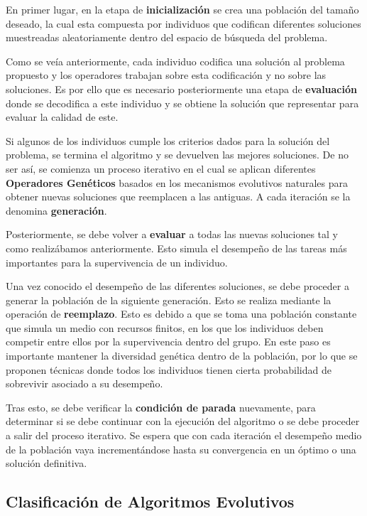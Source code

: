 En primer lugar, en la etapa de \textbf{inicialización} se crea una población del tamaño deseado, la cual esta compuesta por individuos que codifican diferentes soluciones muestreadas aleatoriamente dentro del espacio de búsqueda del problema. 

Como se veía anteriormente, cada individuo codifica una solución al problema propuesto y los operadores trabajan sobre esta codificación y no sobre las soluciones. Es por ello que es necesario posteriormente una etapa de \textbf{evaluación} donde se decodifica a este individuo y se obtiene la solución que representar para evaluar la calidad de este.

Si algunos de los individuos cumple los criterios dados para la solución del problema, se termina el algoritmo y se devuelven las mejores soluciones. De no ser así, se comienza un proceso iterativo en el cual se aplican diferentes \textbf{Operadores Genéticos} basados en los mecanismos evolutivos naturales para obtener nuevas soluciones que reemplacen a las antiguas. A cada iteración se la denomina \textbf{generación}.

Posteriormente, se debe volver a \textbf{evaluar} a todas las nuevas soluciones tal y como realizábamos anteriormente. Esto simula el desempeño de las tareas más importantes para la supervivencia de un individuo.

Una vez conocido el desempeño de las diferentes soluciones, se debe proceder a generar la población de la siguiente generación. Esto se realiza mediante la operación de \textbf{reemplazo}. Esto es debido a que se toma una población constante que simula un medio con recursos finitos, en los que los individuos deben competir entre ellos por la supervivencia dentro del grupo. En este paso es importante mantener la diversidad genética dentro de la población, por lo que se proponen técnicas donde todos los individuos tienen cierta probabilidad de sobrevivir asociado a su desempeño.

Tras esto, se debe verificar la \textbf{condición de parada} nuevamente, para determinar si se debe continuar con la ejecución del algoritmo o se debe proceder a salir del proceso iterativo. Se espera que con cada iteración el desempeño medio de la población vaya incrementándose hasta su convergencia en un óptimo o una solución definitiva.


\subsection{Clasificación de Algoritmos Evolutivos}

